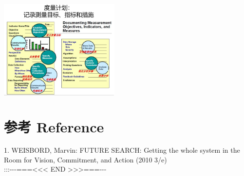 
\includegraphics[width=6cm]{13_MA_plan_Screenshot_2023-10-26_211815.jpg}

\hypertarget{ux53c2ux8003-reference}{%
\section{参考 Reference}\label{ux53c2ux8003-reference}}

1. WEISBORD, Marvin: FUTURE SEARCH: Getting the whole system in the Room
for Vision, Commitment, and Action (2010 3/e)\\
:::-\/-\/-===\textless{}\textless{}\textless{} END
\textgreater{}\textgreater{}\textgreater{}===-\/-\/-


